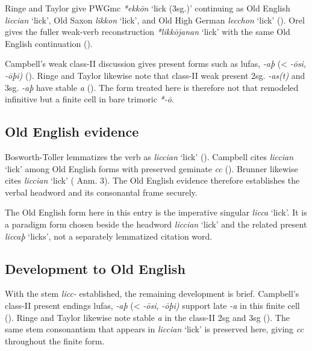 \documentclass[
  british,
  a4paper,
  openany]{book}
\providecommand{\Recon}[1]{\emph{*#1}}
{\catcode`→=\active \global\def→{\ensuremath{\rightarrow}}}
\providecommand{\Recon}[1]{\emph{*#1}}
{\catcode`→=\active \global\def→{\ensuremath{\rightarrow}}}
\begin{document}
Ringe and Taylor give PWGmc \Recon{ekkōn} `lick (3sg.)' continuing as
Old English {\emph{liccian}} `lick', Old Saxon {\emph{likkon}} `lick',
and Old High German {\emph{lecchon}} `lick'
(). Orel gives
the fuller weak-verb reconstruction {\Recon{likkōjanan} `lick'} with the
same Old English continuation ().

Campbell's weak class-II discussion gives present forms such as lufas,
\emph{-aþ} (\textless{} \emph{-ōsi}, \emph{-ōþi)}
(). Ringe and
Taylor likewise note that class-II weak present 2sg. \emph{-as(t)} and
3sg. \emph{-aþ} have stable \emph{a}
(). The form
treated here is therefore not that remodeled infinitive but a finite
cell in bare trimoric \emph{*-ō}.

\subsection{Old English evidence}\label{old-english-evidence-132}

Bosworth-Toller lemmatizes the verb as \emph{liccian} `lick'
().
Campbell cites \emph{liccian} `lick' among Old English forms with
preserved geminate \emph{cc} (). Brunner likewise cites \emph{liccian} `lick'
( Anm. 3). The
Old English evidence therefore establishes the verbal headword and its
consonantal frame securely.

The Old English form here in this entry is the imperative singular
{\emph{licca}} `lick'. It is a paradigm form chosen beside the headword
{\emph{liccian}} `lick' and the related present {\emph{liccaþ}} `licks',
not a separately lemmatized citation word.

\subsection{Development to Old
English}\label{development-to-old-english-132}

With the stem \emph{licc-} established, the remaining development is
brief. Campbell's class-II present endings lufas, \emph{-aþ}
(\textless{} \emph{-ōsi}, \emph{-ōþi)} support late \emph{-a} in this
finite cell ().
Ringe and Taylor likewise note stable \emph{a} in the class-II 2sg and
3sg (). The
same stem consonantism that appears in \emph{liccian} `lick' is
preserved here, giving \emph{cc} throughout the finite form.
\end{document}
